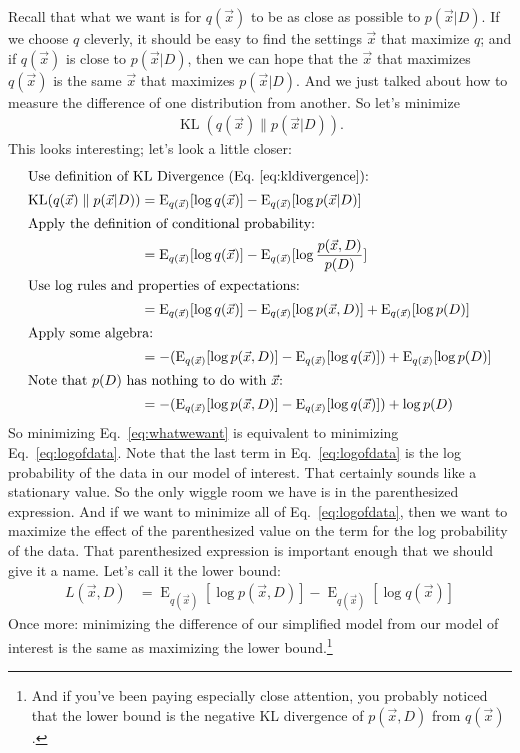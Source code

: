 \documentclass[12pt]{article}
\newcommand{\KL}{\operatorname{KL}}
\newcommand{\E}{\operatorname{E}}
\begin{document}
Recall that what we want is for $q(\vec{x})$ to be as close as possible to
$p(\vec{x}|D)$.  If we choose $q$ cleverly, it should be easy to find the
settings $\vec{x}$ that maximize $q$; and if $q(\vec{x})$ is close to
$p(\vec{x}|D)$, then we can hope that the $\vec{x}$ that maximizes $q(\vec{x})$ is
the same $\vec{x}$ that maximizes $p(\vec{x}|D)$.  And we just talked about how to
measure the difference of one distribution from another.  So let's minimize
\begin{align}\label{eq:whatwewant}
    \KL(q(\vec{x})\parallel p(\vec{x}|D)).
\end{align}
This looks interesting; let's look a little closer:
\begin{align}
    \intertext{Use definition of KL Divergence (Eq.~\ref{eq:kldivergence}):}
    \KL(q(\vec{x})\parallel p(\vec{x}|D))
    &= \E_{q(\vec{x})}[\log q(\vec{x})] - \E_{q(\vec{x})}[\log p(\vec{x}|D)]
    \nonumber \\
    \intertext{Apply the definition of conditional probability:}
    &= \E_{q(\vec{x})}[\log q(\vec{x})] - \E_{q(\vec{x})}[\log
    \frac{p(\vec{x},D)}{p(D)}]
    \nonumber \\
    \intertext{Use log rules and properties of expectations:}
    &= \E_{q(\vec{x})}[\log q(\vec{x})] - \E_{q(\vec{x})}[\log
    p(\vec{x},D)] + \E_{q(\vec{x})}[\log p(D)]
    \nonumber \\
    \intertext{Apply some algebra:}
    &=  - (\E_{q(\vec{x})}[\log
    p(\vec{x},D)] - \E_{q(\vec{x})}[\log q(\vec{x})]) + \E_{q(\vec{x})}[\log p(D)]
    \nonumber \\
    \intertext{Note that $p(D)$ has nothing to do with $\vec{x}$:}
    \label{eq:logofdata}
    &=  - (\E_{q(\vec{x})}[\log
    p(\vec{x},D)] - \E_{q(\vec{x})}[\log q(\vec{x})]) + \log p(D)
\end{align}
So minimizing Eq.~\ref{eq:whatwewant} is equivalent to minimizing
Eq.~\ref{eq:logofdata}.  Note that the last term in Eq.~\ref{eq:logofdata} is
the log probability of the data in our model of interest.  That certainly sounds
like a stationary value.  So the only wiggle room we have is in the
parenthesized expression.  And if we want to minimize all of
Eq.~\ref{eq:logofdata}, then we want to maximize the effect of the parenthesized
value on the term for the log probability of the data.  That parenthesized
expression is important enough that we should give it a name.  Let's call it the
lower bound:
\begin{align}\label{eq:lowerbound}
    L(\vec{x},D) &= \E_{q(\vec{x})}[\log p(\vec{x},D)]
    - \E_{q(\vec{x})}[\log q(\vec{x})]
\end{align}
Once more:  minimizing the difference of our simplified model from our model of
interest is the same as maximizing the lower bound.\footnote{And if you've been
paying especially close attention, you probably noticed that the lower bound is
the negative KL divergence of $p(\vec{x},D)$ from $q(\vec{x})$.}
\end{document}
